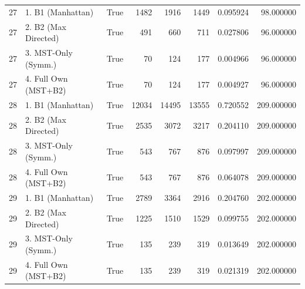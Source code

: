 \begin{table}[htbp]
\begin{tabular}{rlrrrrrr}
27 & 1. B1 (Manhattan) & True & 1482 & 1916 & 1449 & 0.095924 & 98.000000 \\
27 & 2. B2 (Max Directed) & True & 491 & 660 & 711 & 0.027806 & 96.000000 \\
27 & 3. MST-Only (Symm.) & True & 70 & 124 & 177 & 0.004966 & 96.000000 \\
27 & 4. Full Own (MST+B2) & True & 70 & 124 & 177 & 0.004927 & 96.000000 \\
28 & 1. B1 (Manhattan) & True & 12034 & 14495 & 13555 & 0.720552 & 209.000000 \\
28 & 2. B2 (Max Directed) & True & 2535 & 3072 & 3217 & 0.204110 & 209.000000 \\
28 & 3. MST-Only (Symm.) & True & 543 & 767 & 876 & 0.097997 & 209.000000 \\
28 & 4. Full Own (MST+B2) & True & 543 & 767 & 876 & 0.064078 & 209.000000 \\
29 & 1. B1 (Manhattan) & True & 2789 & 3364 & 2916 & 0.204760 & 202.000000 \\
29 & 2. B2 (Max Directed) & True & 1225 & 1510 & 1529 & 0.099755 & 202.000000 \\
29 & 3. MST-Only (Symm.) & True & 135 & 239 & 319 & 0.013649 & 202.000000 \\
29 & 4. Full Own (MST+B2) & True & 135 & 239 & 319 & 0.021319 & 202.000000 \\
\bottomrule
\end{tabular}

\end{table}
